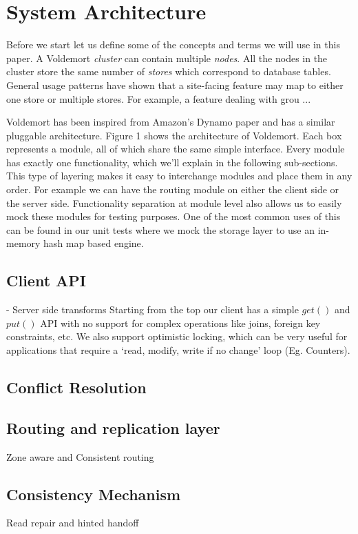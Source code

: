 \documentclass[10pt,twocolumn,preprint,natbib,authoryear]{sigplanconf}
\begin{document}
\section{System Architecture}

Before we start let us define some of the concepts and terms we will use in this paper. A Voldemort \emph{cluster} can contain multiple \emph{nodes}. All the nodes in the cluster store the same number of \emph{stores} which correspond to database tables. General usage patterns have shown that a site-facing feature may map to either one store or multiple stores. For example, a feature dealing with grou ...

Voldemort has been inspired from Amazon's Dynamo paper and has a similar pluggable architecture. Figure 1 shows the architecture of Voldemort. Each box represents a module, all of which share the same simple interface. Every module has exactly one functionality, which we'll explain in the following sub-sections. This type of layering makes it easy to interchange modules and place them in any order. For example we can have the routing module on either the client side or the server side. Functionality separation at module level also allows us to easily mock these modules for testing purposes. One of the most common uses of this can be found in our unit tests where we mock the storage layer to use an in-memory hash map based engine. 

\subsection {Client API }  
- Server side transforms
Starting from the top our client has a simple $get()$ and $put()$ API with no support for complex operations like joins, foreign key constraints, etc. We also support optimistic locking, which can be very useful for applications that require a `read, modify, write if no change' loop (Eg. Counters). 

\subsection {Conflict Resolution }  


\subsection {Routing and replication layer }  
Zone aware and Consistent routing

\subsection {Consistency Mechanism }
Read repair and hinted handoff
\end{document}
